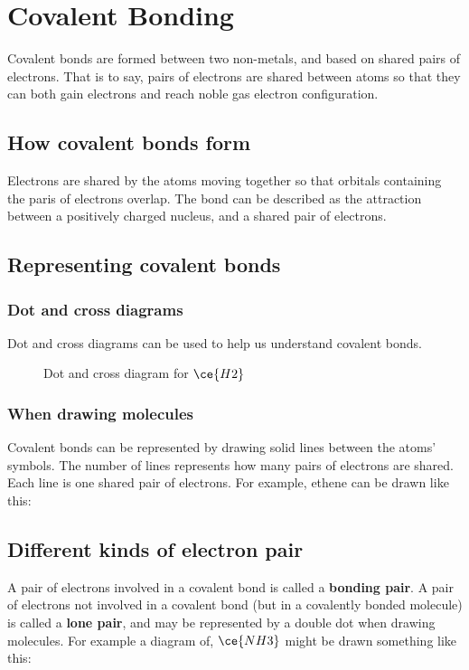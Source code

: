 \section{Covalent Bonding}
Covalent bonds are formed between two non-metals, and based on shared pairs of electrons. That is to say, pairs of electrons are shared between atoms so that they can both gain electrons and reach noble gas electron configuration.

\subsection{How covalent bonds form}
Electrons are shared by the atoms moving together so that orbitals containing the paris of electrons overlap. The bond can be described as the attraction between a positively charged nucleus, and a shared pair of electrons.

\subsection{Representing covalent bonds}
\subsubsection{Dot and cross diagrams}
Dot and cross diagrams can be used to help us understand covalent bonds.
\begin{figure}[ht]
    \centering
	\caption{Dot and cross diagram for $\ce{H2}$}
    \label{fig:dot-and-cross-diagram-for-h2}
\end{figure}
\subsubsection{When drawing molecules}
Covalent bonds can be represented by drawing solid lines between the atoms' symbols. The number of lines represents how many pairs of electrons are shared. Each line is one shared pair of electrons. For example, ethene can be drawn like this:\\

\subsection{Different kinds of electron pair}
A pair of electrons involved in a covalent bond is called a \textbf{bonding pair}. A pair of electrons not involved in a covalent bond (but in a covalently bonded molecule) is called a \textbf{lone pair}, and may be represented by a double dot when drawing molecules. For example a diagram of, $\ce{NH3}$ might be drawn something like this:

